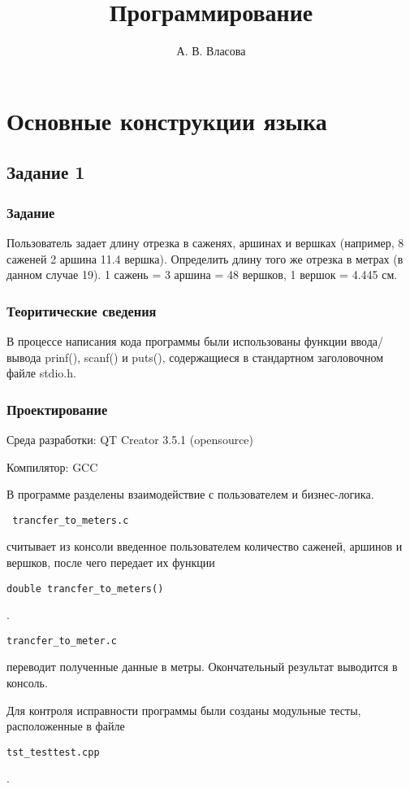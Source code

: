 \documentclass[12pt,a4paper]{report}
\author{А. В. Власова}
\title{Программирование}
\begin{document}
\listoftodos
\maketitle
\chapter{Основные конструкции языка}
\section{Задание 1}
\subsection{Задание}
Пользователь задает длину отрезка в саженях, аршинах и вершках (например, 8 саженей 2 аршина 11.4 вершка). Определить длину того же отрезка в метрах (в данном случае 19). 1 сажень = 3 аршина = 48 вершков, 1 вершок = 4.445 см.
\subsection{Теоритические сведения}

В процессе написания кода программы были использованы функции ввода/вывода prinf(), scanf() и puts(), содержащиеся в стандартном заголовочном файле stdio.h. 


\subsection{Проектирование}

Среда разработки: QT Creator 3.5.1 (opensource)

Компилятор: GCC

В программе разделены взаимодействие с пользователем и бизнес-логика.\begin{verbatim} trancfer_to_meters.c\end{verbatim}  считывает из консоли введенное пользователем количество саженей, аршинов и вершков, после чего передает их функции \begin{verbatim}double trancfer_to_meters() \end{verbatim}.\begin{verbatim}trancfer_to_meter.c \end{verbatim} переводит полученные данные в метры. Окончательный результат выводится в консоль.

Для контроля исправности программы были созданы модульные тесты, расположенные в файле \begin{verbatim}tst_testtest.cpp \end{verbatim}.
\end{document}

